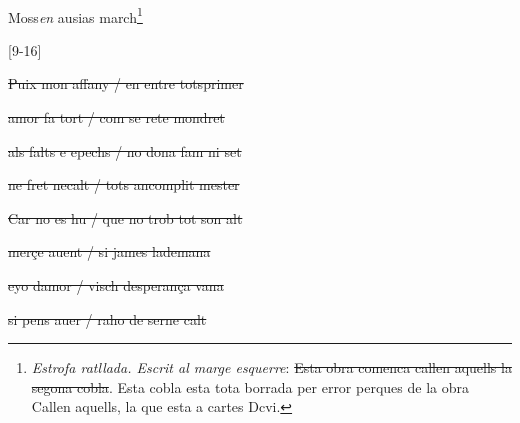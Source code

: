 \documentclass[12pt]{article}
\renewcommand{\espaiAbansEtiquetaPoema}{\vspace{0ex}}
\begin{document}
\begin{estrofa}

\espaiAbansEtiquetaPoema

\\

\begin{rubrica}

\pagina{[163r]}Moss\textit{en} ausias march\footnote{\textit{Estrofa ratllada.
Escrit al marge esquerre}: \sout{Esta obra comenca callen aquells la segona
cobla}. Esta cobla esta tota borrada per error perques de la obra Callen aquells,
la que esta a cartes Dcvi.}

\end{rubrica}

\end{estrofa}




\begin{estrofaBuida}


\end{estrofaBuida}


\begin{estrofaExtra}%




\begin{Versos}

[9-16]

\end{Versos}


\end{estrofaExtra}


\begin{estrofa}

 \sout{Puix mon affany / en entre totsprimer}

 \sout{amor fa tort / com se rete mondret}

 \sout{als falts e epechs / no dona fam ni set}

 \sout{ne fret necalt / tots ancomplit mester}

 \sout{Car no es hu / que no trob tot son alt}

 \sout{mer\c{c}e auent / si james lademana}

 \sout{eyo damor / visch desperan\c{c}a vana}

 \sout{si pens auer / raho de serne calt}

\end{estrofa}





\begin{estrofaBuida}


\end{estrofaBuida}



\begin{estrofaBuida}


\end{estrofaBuida}



\begin{estrofaBuida}


\end{estrofaBuida}



\begin{estrofaBuida}


\end{estrofaBuida}
\end{document}

